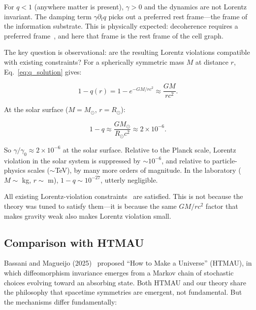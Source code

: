 \documentclass[aps,prd,twocolumn,showpacs,superscriptaddress,preprintnumbers]{revtex4-2}
\begin{document}
For $q<1$ (anywhere matter is present), $\gamma>0$ and the dynamics are not Lorentz invariant.
The damping term $\gamma\partial_t q$ picks out a preferred rest frame---the frame of the information substrate.
This is physically expected: decoherence requires a preferred frame~\cite{Bassi:2013mta}, and here that frame is the rest frame of the cell graph.

The key question is observational: are the resulting Lorentz violations compatible with existing constraints?
For a spherically symmetric mass $M$ at distance $r$, Eq.~\eqref{eq:q_solution} gives:

\begin{equation}
1 - q(r) = 1 - e^{-GM/rc^2} \approx \frac{GM}{rc^2}.
\label{eq:lv_estimate}
\end{equation}

At the solar surface ($M=M_\odot$, $r=R_\odot$):

\begin{equation}
1 - q \approx \frac{GM_\odot}{R_\odot c^2} \approx 2 \times 10^{-6}.
\label{eq:solar_lv}
\end{equation}

So $\gamma/\gamma_0 \approx 2\times 10^{-6}$ at the solar surface.
Relative to the Planck scale, Lorentz violation in the solar system is suppressed by $\sim 10^{-6}$, and relative to particle-physics scales ($\sim$TeV), by many more orders of magnitude.
In the laboratory ($M\sim$ kg, $r\sim$ m), $1-q\sim 10^{-27}$, utterly negligible.

All existing Lorentz-violation constraints~\cite{Kostelecky:2008,Mewes:2013} are satisfied.
This is not because the theory was tuned to satisfy them---it is because the same $GM/rc^2$ factor that makes gravity weak also makes Lorentz violation small.

\subsection{Comparison with HTMAU}

Bassani and Magueijo (2025)~\cite{Bassani:2025htma} proposed ``How to Make a Universe'' (HTMAU), in which diffeomorphism invariance emerges from a Markov chain of stochastic choices evolving toward an absorbing state.
Both HTMAU and our theory share the philosophy that spacetime symmetries are emergent, not fundamental.
But the mechanisms differ fundamentally:
\end{document}
